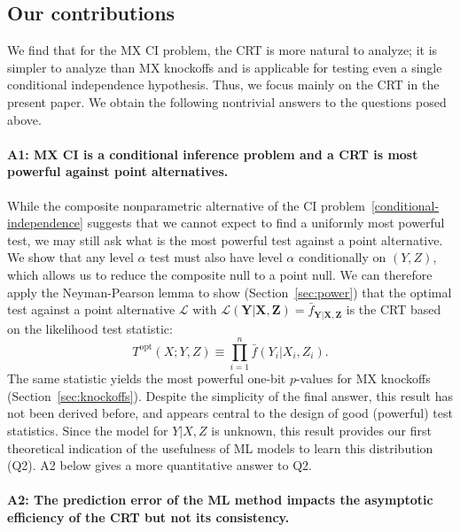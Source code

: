 \documentclass[12pt]{article}
\theoremstyle{definition}
\theoremstyle{remark}
\newcommand{\prx}{\bm X}
\newcommand{\srx}{X}
\newcommand{\prz}{\bm Z}
\newcommand{\srz}{Z}
\newcommand{\pry}{{\bm Y}}
\newcommand{\sry}{Y}
\begin{document}
\subsection{Our contributions}



We find that for the MX CI problem, the CRT is more natural to analyze; it is simpler to analyze than MX knockoffs and is applicable for testing even a single conditional independence hypothesis. Thus, we focus mainly on the CRT in the present paper. We obtain the following nontrivial answers to the questions posed above.

\paragraph{A1: MX CI is a conditional inference problem and a CRT is most powerful against point alternatives.}

While the composite nonparametric alternative of the CI problem~\eqref{conditional-independence} suggests that we cannot expect to find a uniformly most powerful test, we may still ask what is the most powerful test against a point alternative. We show that any level $\alpha$ test must also have level $\alpha$ conditionally on $(\sry, \srz)$, which allows us to reduce the composite null to a point null. We can therefore apply the Neyman-Pearson lemma to show (Section~\ref{sec:power}) that the optimal test against a point alternative $\mathcal L$ with $\mathcal L(\pry|\prx,\prz) = \bar f_{\pry|\prx,\prz}$ is the CRT based on the likelihood test statistic:
\begin{equation}
	T^{\text{opt}}(\srx; \sry, \srz) \equiv \prod_{i = 1}^n \bar f(\sry_i|\srx_i, \srz_i).
\end{equation}
The same statistic yields the most powerful one-bit $p$-values for MX knockoffs (Section~\ref{sec:knockoffs}). Despite the simplicity of the final answer, this result has not been derived before, and appears central to the design of good (powerful) test statistics. Since the model for $Y|X,Z$ is unknown, this result provides our first theoretical indication of the usefulness of ML models to learn this distribution (Q2). A2 below gives a more quantitative answer to Q2.

\paragraph{A2: The prediction error of the ML method impacts the asymptotic efficiency of the CRT but not its consistency.}
\end{document}
